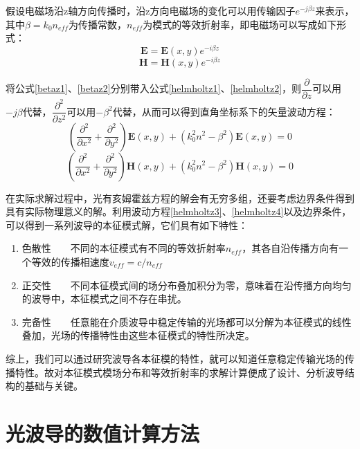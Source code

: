 假设电磁场沿z轴方向传播时，沿z方向电磁场的变化可以用传输因子$e^{-j\beta z}$来表示，其中$\beta=k_{0}n_{eff}$为传播常数，$n_{eff}$为模式的等效折射率，即电磁场可以写成如下形式：
\begin{equation}
\label{betaz1}
\textbf{E}=\textbf{E}(x,y)e^{-i\beta z}
\end{equation}
\begin{equation}
\label{betaz2}
\textbf{H}=\textbf{H}(x,y)e^{-i\beta z}
\end{equation}

将公式\ref{betaz1}、\ref{betaz2}分别带入公式\ref{helmholtz1}、\ref{helmholtz2}，则$\dfrac{\partial}{\partial z}$可以用$-j\beta$代替，$\dfrac{\partial^{2}}{\partial z^2}$可以用$-\beta^2$代替，从而可以得到直角坐标系下的矢量波动方程：
\begin{equation}
\label{helmholtz3}
\left(\dfrac{\partial^2}{\partial x^2}+\dfrac{\partial^2}{\partial y^2}\right)\textbf{E}(x,y)+(k_0^2n^2-\beta^2)\textbf{E}(x,y)=0
\end{equation}
\begin{equation}
\label{helmholtz4}
\left(\dfrac{\partial^2}{\partial x^2}+\dfrac{\partial^2}{\partial y^2}\right)\textbf{H}(x,y)+(k_0^2n^2-\beta^2)\textbf{H}(x,y)=0
\end{equation}

在实际求解过程中，光有亥姆霍兹方程的解会有无穷多组，还要考虑边界条件得到具有实际物理意义的解。利用波动方程\ref{helmholtz3}、\ref{helmholtz4}以及边界条件，可以得到一系列波导的本征模式解，它们具有如下特性：
\begin{enumerate}[(1)]
	\item 
	色散性~~~~不同的本征模式有不同的等效折射率$n_{eff}$，其各自沿传播方向有一个等效的传播相速度$v_{eff}=c/n_{eff}$
	\item 
	正交性~~~~不同本征模式间的场分布叠加积分为零，意味着在沿传播方向均匀的波导中，本征模式之间不存在串扰。
	\item 
	完备性~~~~任意能在介质波导中稳定传输的光场都可以分解为本征模式的线性叠加，光场的传播特性由这些本征模式的特性所决定。
\end{enumerate}

综上，我们可以通过研究波导各本征模的特性，就可以知道任意稳定传输光场的传播特性。故对本征模式模场分布和等效折射率的求解计算便成了设计、分析波导结构的基础与关键。

\section{光波导的数值计算方法}

